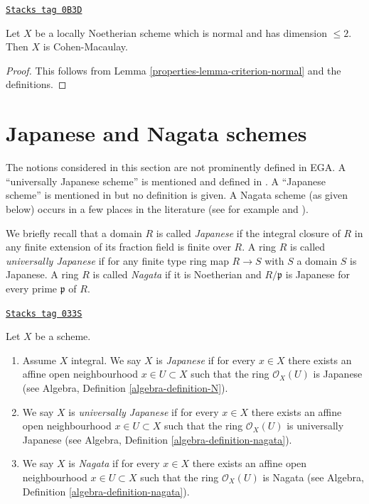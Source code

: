 \begin{lemma}
\label{properties-lemma-normal-dimension-2-Cohen-Macaulay}
\href{https://stacks.math.columbia.edu/tag/0B3D}{\texttt{Stacks tag 0B3D}}

Let $X$ be a locally Noetherian scheme which is normal and
has dimension $\leq 2$. Then $X$ is Cohen-Macaulay.
\end{lemma}

\begin{proof}

This follows from Lemma \ref{properties-lemma-criterion-normal} and the definitions.
\end{proof}

\section{Japanese and Nagata schemes}
\label{properties-section-nagata}
The notions considered in this section are not prominently defined in EGA.
A ``universally Japanese scheme'' is mentioned and defined in
\cite[IV Corollary 5.11.4]{EGA}. A ``Japanese scheme'' is mentioned in
\cite[IV Remark 10.4.14 (ii)]{EGA} but no definition is given.
A Nagata scheme (as given below) occurs in a few
places in the literature (see for example \cite[Definition 8.2.30]{Liu} and
\cite[Page 142]{Greco}).

\medskip\noindent
We briefly recall that a domain $R$ is called {\it Japanese} if the integral
closure of $R$ in any finite extension of its fraction field is finite over
$R$. A ring $R$ is called {\it universally Japanese} if for any finite type
ring map $R \to S$ with $S$ a domain $S$ is Japanese. A ring $R$ is called
{\it Nagata} if it is Noetherian and $R/\mathfrak p$ is Japanese for every
prime $\mathfrak p$ of $R$.

\begin{definition}[Nagata]
\label{properties-definition-nagata}
\href{https://stacks.math.columbia.edu/tag/033S}{\texttt{Stacks tag 033S}}

Let $X$ be a scheme.
\begin{enumerate}
\item Assume $X$ integral. We say $X$ is {\it Japanese}
if for every $x \in X$ there exists an
affine open neighbourhood $x \in U \subset X$ such that the ring
$\mathcal{O}_X(U)$ is Japanese (see
Algebra, Definition \ref{algebra-definition-N}).
\item We say $X$ is {\it universally Japanese} if for every $x \in X$
there exists an affine open neighbourhood $x \in U \subset X$ such that
the ring $\mathcal{O}_X(U)$ is universally Japanese (see
Algebra, Definition \ref{algebra-definition-nagata}).
\item We say $X$ is {\it Nagata} if for every $x \in X$ there exists an
affine open neighbourhood $x \in U \subset X$ such that the ring
$\mathcal{O}_X(U)$ is Nagata (see
Algebra, Definition \ref{algebra-definition-nagata}).
\end{enumerate}
\end{definition}

